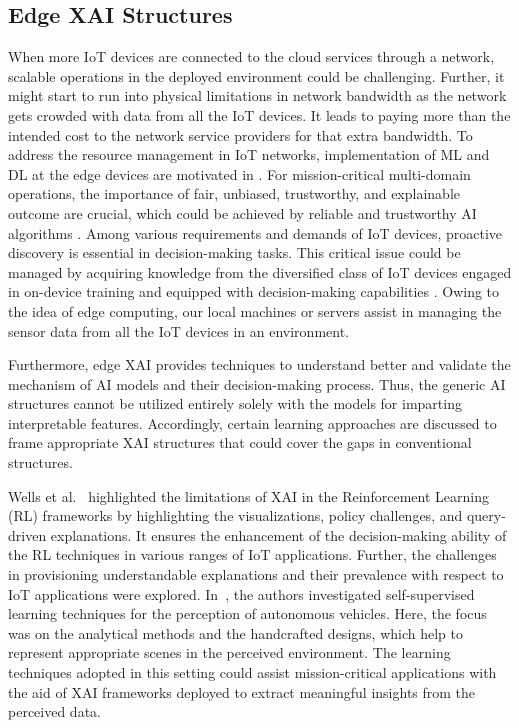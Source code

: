 \documentclass[journal]{IEEEtran}
\begin{document}
\subsection{Edge XAI Structures}
When more IoT devices are connected to the cloud services through a network, scalable operations in the deployed environment could be challenging. Further, it might start to run into physical limitations in network bandwidth as the network gets crowded with data from all the IoT devices. It leads to paying more than the intended cost to the network service providers for that extra bandwidth. To address the resource management in IoT networks, implementation of ML and DL at the edge devices are motivated in \cite{hussain2020machine}. For mission-critical multi-domain operations, the importance of fair, unbiased, trustworthy, and explainable outcome are crucial, which could be achieved by reliable and trustworthy AI algorithms \cite{rawat2021secure}. Among various requirements and demands of IoT devices, proactive discovery is essential in decision-making tasks. This critical issue could be managed by acquiring knowledge from the diversified class of IoT devices engaged in on-device training and equipped with decision-making capabilities \cite{yao2019recommendations}. Owing to the idea of edge computing, our local machines or servers assist in managing the sensor data from all the IoT devices in an environment. 

Furthermore, edge XAI provides techniques to understand better and validate the mechanism of AI models and their decision-making process. Thus, the generic AI structures cannot be utilized entirely solely with the models for imparting interpretable features. Accordingly, certain learning approaches are discussed to frame appropriate XAI structures that could cover the gaps in conventional structures.

Wells et al.~\cite{wells2021explainable} highlighted the limitations of XAI in the Reinforcement Learning (RL) frameworks by highlighting the visualizations, policy challenges, and query-driven explanations. It ensures the enhancement of the decision-making ability of the RL techniques in various ranges of IoT applications. Further, the challenges in provisioning understandable explanations and their prevalence with respect to IoT applications were explored. In~\cite{chiaroni2020self}, the authors investigated self-supervised learning techniques for the perception of autonomous vehicles. Here, the focus was on the analytical methods and the handcrafted designs, which help to represent appropriate scenes in the perceived environment. The learning techniques adopted in this setting could assist mission-critical applications with the aid of XAI frameworks deployed to extract meaningful insights from the perceived data.
\end{document}
